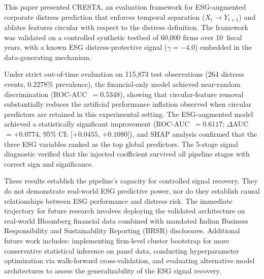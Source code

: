 \documentclass[sigconf,anonymous]{acmart}
\begin{document}
This paper presented CRESTA, an evaluation framework for ESG-augmented corporate distress prediction that enforces temporal separation ($X_t \to Y_{t+1}$) and ablates features circular with respect to the distress definition. The framework was validated on a controlled synthetic testbed of 60,000 firms over 10~fiscal years, with a known ESG distress-protective signal ($\gamma = -4.0$) embedded in the data-generating mechanism.

Under strict out-of-time evaluation on 115,873 test observations (264 distress events, 0.2278\% prevalence), the financial-only model achieved near-random discrimination (ROC-AUC~$= 0.5348$), showing that circular-feature removal substantially reduces the artificial performance inflation observed when circular predictors are retained in this experimental setting. The ESG-augmented model achieved a statistically significant improvement (ROC-AUC~$= 0.6117$; $\Delta$AUC~$= +0.0774$, 95\% CI: [$+0.0455$, $+0.1080$]), and SHAP analysis confirmed that the three ESG variables ranked as the top global predictors. The 5-stage signal diagnostic verified that the injected coefficient survived all pipeline stages with correct sign and significance.

These results establish the pipeline's capacity for controlled signal recovery. They do not demonstrate real-world ESG predictive power, nor do they establish causal relationships between ESG performance and distress risk. The immediate trajectory for future research involves deploying the validated architecture on real-world Bloomberg financial data combined with mandated Indian Business Responsibility and Sustainability Reporting (BRSR) disclosures. Additional future work includes: implementing firm-level cluster bootstrap for more conservative statistical inference on panel data, conducting hyperparameter optimization via walk-forward cross-validation, and evaluating alternative model architectures to assess the generalizability of the ESG signal recovery.
\end{document}
